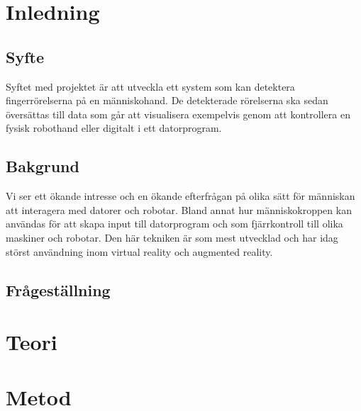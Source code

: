 \documentclass[a4paper]{article}
\begin{document}



\begin{abstract}
       
\end{abstract}
   
\begin{otherlanguage}{english}
    \begin{abstract}
    \end{abstract}
\end{otherlanguage}

\tableofcontents

\section{Inledning}
\subsection{Syfte}
Syftet med projektet är att utveckla ett system som kan detektera fingerrörelserna på en människohand. 
De detekterade rörelserna ska sedan översättas till data som går att visualisera exempelvis genom att kontrollera en fysisk robothand eller digitalt i ett datorprogram. 
\subsection{Bakgrund}
Vi ser ett ökande intresse och en ökande efterfrågan på olika sätt för människan att interagera med datorer och robotar. Bland annat hur människokroppen kan användas för att skapa input till datorprogram och som fjärrkontroll till olika maskiner och robotar. 
Den här tekniken är som mest utvecklad och har idag störst användning inom virtual reality och augmented reality. 

\subsection{Frågeställning}

\section{Teori}

\section{Metod}
\end{document}
